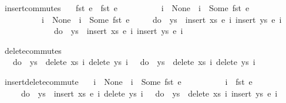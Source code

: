 \documentclass[acmlarge,review,anonymous]{acmart}\settopmatter{printfolios=true}
\begin{document}
\begin{isabellebody}
\isanewline
{}\isamarkupfalse%
\ insert{\isacharunderscore}commutes{\isacharcolon}\isanewline
\ \ \ {\isachardoublequoteopen}fst\ e{}\ {\isasymnoteq}\ fst\ e{}{\isachardoublequoteclose}\isanewline
\ \ \ \ \ \ \ \ \ \ {\isachardoublequoteopen}i{}\ {\isacharequal}\ None\ {\isasymor}\ i{}\ {\isasymnoteq}\ Some\ {\isacharparenleft}fst\ e{}{\isacharparenright}{\isachardoublequoteclose}\isanewline
\ \ \ \ \ \ \ \ \ \ {\isachardoublequoteopen}i{}\ {\isacharequal}\ None\ {\isasymor}\ i{}\ {\isasymnoteq}\ Some\ {\isacharparenleft}fst\ e{}{\isacharparenright}{\isachardoublequoteclose}\isanewline
\ \ \ \ \ {\isachardoublequoteopen}do\ {\isacharbraceleft}\ ys\ {\isasymleftarrow}\ insert\ xs\ e{}\ i{}{\isacharsemicolon}\ insert\ ys\ e{}\ i{}\ {\isacharbraceright}\ {\isacharequal}\isanewline
\ \ \ \ \ \ \ \ \ \ \ \ \ do\ {\isacharbraceleft}\ ys\ {\isasymleftarrow}\ insert\ xs\ e{}\ i{}{\isacharsemicolon}\ insert\ ys\ e{}\ i{}\ {\isacharbraceright}{\isachardoublequoteclose}\isanewline
\end{isabellebody}


\begin{isabellebody}
\isanewline
{}\isamarkupfalse%
\ delete{\isacharunderscore}commutes{\isacharcolon}\isanewline
\ \ \ {\isachardoublequoteopen}do\ {\isacharbraceleft}\ ys\ {\isasymleftarrow}\ delete\ xs\ i{}{\isacharsemicolon}\ delete\ ys\ i{}\ {\isacharbraceright}\ {\isacharequal}\ do\ {\isacharbraceleft}\ ys\ {\isasymleftarrow}\ delete\ xs\ i{}{\isacharsemicolon}\ delete\ ys\ i{}\ {\isacharbraceright}{\isachardoublequoteclose}\isanewline
\end{isabellebody}


\begin{isabellebody}
\isanewline
{}\isamarkupfalse%
\ insert{\isacharunderscore}delete{\isacharunderscore}commute{\isacharcolon}\isanewline
\ \ \ {\isachardoublequoteopen}i{}\ {\isacharequal}\ None\ {\isasymor}\ i{}\ {\isasymnoteq}\ Some\ {\isacharparenleft}fst\ e{\isacharparenright}{\isachardoublequoteclose}\isanewline
\ \ \ \ \ \ \ \ \ \ {\isachardoublequoteopen}i{}\ {\isasymnoteq}\ fst\ e{\isachardoublequoteclose}\isanewline
\ \ \ \ \ {\isachardoublequoteopen}do\ {\isacharbraceleft}\ ys\ {\isasymleftarrow}\ insert\ xs\ e\ i{}{\isacharsemicolon}\ delete\ ys\ i{}\ {\isacharbraceright}\ {\isacharequal}\ do\ {\isacharbraceleft}\ ys\ {\isasymleftarrow}\ delete\ xs\ i{}{\isacharsemicolon}\ insert\ ys\ e\ i{}\ {\isacharbraceright}{\isachardoublequoteclose}\isanewline
\end{isabellebody}
\end{document}
